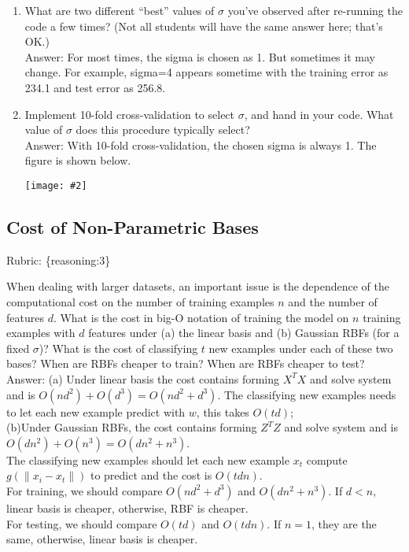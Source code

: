 \documentclass{article}
\def\rubric#1{\gre{Rubric: \{#1\}}}{}
\def\blu#1{{\color{blu}#1}}
\def\gre#1{{\color{gre}#1}}
\def\norm#1{\|#1\|}
\newcommand{\centerfig}[2]{\begin{center}\texttt{[image: \#2]}\end{center}}
\def\enum#1{\begin{enumerate}#1\end{enumerate}}
\begin{document}
\blu{\enum{
\item What are two different ``best'' values of $\sigma$ you've observed after re-running the code a few times? (Not all students will have the same answer here; that's OK.)
\textcolor{gre}{\\Answer: For most times, the sigma is chosen as 1. But sometimes it may change. For example, sigma=4 appears sometime with the training error as 234.1 and test error as 256.8.}
\item Implement 10-fold cross-validation to select $\sigma$, and hand in your code. What value of $\sigma$ does this procedure typically select?
\textcolor{gre}{\\Answer: With 10-fold cross-validation, the chosen sigma is always 1. The figure is shown below.}
\centerfig{.7}{/Users/rachelsunderland/Desktop/a3_figs/figs/least_squares_rbf_cv.pdf}
}}


\subsection{Cost of Non-Parametric Bases}
\rubric{reasoning:3}

When dealing with larger datasets, an important issue is the dependence of the
computational cost on the number of training examples $n$ and the number of
features $d$. \blu{What is the cost in big-O notation of training the model
on $n$ training examples with $d$ features under (a) the linear basis and
(b) Gaussian RBFs (for a fixed $\sigma$)? What is the cost of
classifying $t$ new examples under each of these two bases? When are RBFs
cheaper to train? When are RBFs cheaper to test?}
\textcolor{gre}{\\Answer: (a) Under linear basis the cost contains forming $X^TX$ and solve system and is $O(nd^2)+O(d^3)=O(nd^2+d^3)$. The classifying new examples needs to let each new example predict with $w$, this takes $O(td)$; \\(b)Under Gaussian RBFs, the cost contains forming $Z^TZ$ and solve system and is $O(dn^2)+O(n^3)=O(dn^2+n^3)$. \\The classifying new examples should let each new example $x_{t}$ compute $g(\norm{x_{i}-x_{t}})$ to predict and the cost is $O(tdn)$. \\For training, we should compare $O(nd^2+d^3)$ and $O(dn^2+n^3)$. If $d<n$, linear basis is cheaper, otherwise, RBF is cheaper. \\For testing, we should compare $O(td)$ and $O(tdn)$. If $n=1$, they are the same, otherwise, linear basis is cheaper.}
\end{document}
